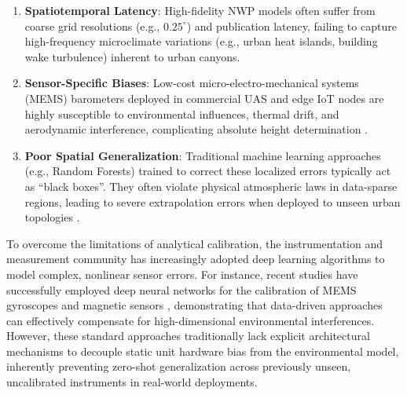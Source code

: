 \begin{enumerate}
    \item \textbf{Spatiotemporal Latency}: High-fidelity NWP models often suffer from coarse grid resolutions (e.g., $0.25^\circ$) and publication latency, failing to capture high-frequency microclimate variations (e.g., urban heat islands, building wake turbulence) inherent to urban canyons.
    \item \textbf{Sensor-Specific Biases}: Low-cost micro-electro-mechanical systems (MEMS) barometers deployed in commercial UAS and edge IoT nodes are highly susceptible to environmental influences, thermal drift, and aerodynamic interference, complicating absolute height determination \cite{sun20253d, li2023precise}.
    \item \textbf{Poor Spatial Generalization}: Traditional machine learning approaches (e.g., Random Forests) trained to correct these localized errors typically act as ``black boxes''. They often violate physical atmospheric laws in data-sparse regions, leading to severe extrapolation errors when deployed to unseen urban topologies \cite{zhang2020urban}.
\end{enumerate}

To overcome the limitations of analytical calibration, the instrumentation and measurement community has increasingly adopted deep learning algorithms to model complex, nonlinear sensor errors. For instance, recent studies have successfully employed deep neural networks for the calibration of MEMS gyroscopes \cite{huang2022mems} and magnetic sensors \cite{duan2025accurate}, demonstrating that data-driven approaches can effectively compensate for high-dimensional environmental interferences. However, these standard approaches traditionally lack explicit architectural mechanisms to decouple static unit hardware bias from the environmental model, inherently preventing zero-shot generalization across previously unseen, uncalibrated instruments in real-world deployments.

